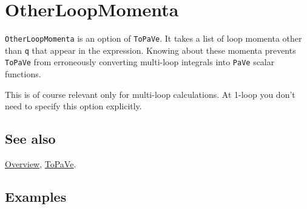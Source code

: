 \documentclass[../FeynCalcManual.tex]{subfiles}
\begin{document}
\hypertarget{otherloopmomenta}{%
\section{OtherLoopMomenta}\label{otherloopmomenta}}

\texttt{OtherLoopMomenta} is an option of \texttt{ToPaVe}. It takes a
list of loop momenta other than \texttt{q} that appear in the
expression. Knowing about these momenta prevents \texttt{ToPaVe} from
erroneously converting multi-loop integrals into \texttt{PaVe} scalar
functions.

This is of course relevant only for multi-loop calculations. At 1-loop
you don't need to specify this option explicitly.

\subsection{See also}

\hyperlink{toc}{Overview}, \hyperlink{topave}{ToPaVe}.

\subsection{Examples}
\end{document}
